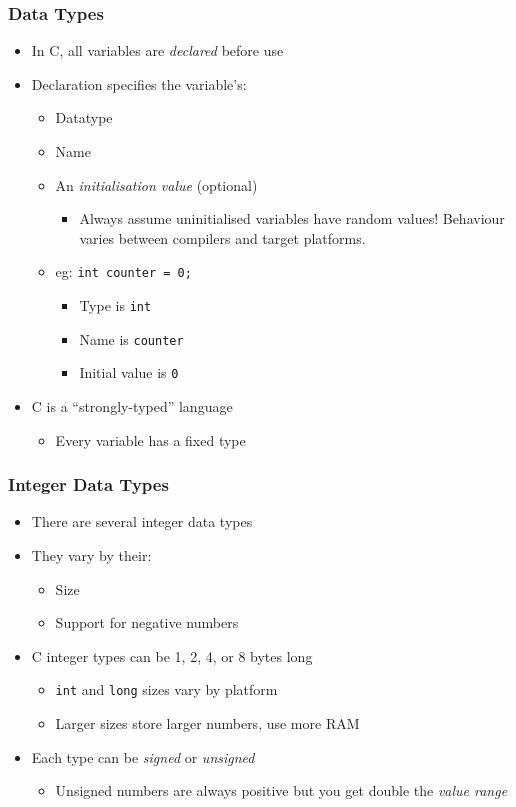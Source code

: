 \documentclass[14pt]{beamer}
\begin{document}
\begin{frame}
\frametitle{Data Types}
\begin{itemize}
\item In C, all variables are \textit{declared} before use
\item Declaration specifies the variable's:
	\begin{itemize}
		\item Datatype
		\item Name
		\item An \textit{initialisation value} (optional)
			\begin{itemize}
				\item Always assume uninitialised variables have random values! Behaviour varies between compilers and target platforms.
			\end{itemize}
		\item eg: \texttt{int counter = 0;}
			\begin{itemize}
				\item Type is \texttt{int}
				\item Name is \texttt{counter}
				\item Initial value is \texttt{0}
			\end{itemize}
	\end{itemize}
\item C is a ``strongly-typed'' language
	\begin{itemize}
		\item Every variable has a fixed type
	\end{itemize}
\end{itemize}
\end{frame}

\begin{frame}
\frametitle{Integer Data Types}
\begin{itemize}
\item There are several integer data types
\item They vary by their:
	\begin{itemize}
		\item Size
		\item Support for negative numbers
	\end{itemize}
\item C integer types can be 1, 2, 4, or 8 bytes long
	\begin{itemize}
		\item \texttt{int} and \texttt{long} sizes vary by platform
		\item Larger sizes store larger numbers, use more RAM
	\end{itemize}
\item Each type can be \textit{signed} or \textit{unsigned}
	\begin{itemize}
		\item Unsigned numbers are always positive but you get double the \textit{value range}
	\end{itemize}
\end{itemize}
\end{frame}
\end{document}
